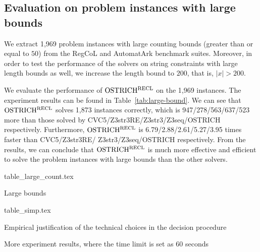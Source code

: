 
%


\subsection{Evaluation on problem instances with large bounds}\label{subsec:large_bounds_eval}

We extract 1,969 problem instances with large counting bounds (greater than or equal to $50$) from the RegCoL and AutomatArk benchmark suites.  
Moreover, in order to test the performance of the solvers on string constraints with large length bounds as well, we increase the length bound to $200$, that is, $|x| > 200$.

We evaluate the performance of $\rm OSTRICH^{RECL}$ on the 1,969 instances. 
The experiment results can be found in Table~\ref{tab:large-bound}. We can see that $\rm OSTRICH^{RECL}$ solves 1,873 instances correctly, which is 947/278/563/637/523 more than those solved by CVC5/Z3str3RE/Z3str3/Z3seq/OSTRICH respectively. Furthermore, $\rm OSTRICH^{RECL}$ is 6.79/2.88/2.61/5.27/3.95 times faster than CVC5/Z3str3RE/ Z3str3/Z3seq/OSTRICH respectively. From the results, we can conclude that $\rm OSTRICH^{RECL}$ is much more effective and efficient to solve the problem instances with large bounds than the other solvers.  

\begin{table}
  \centering
  \begin{subtable}{0.53\textwidth}
      \centering
    {table_large_count.tex}
      \caption{Large bounds}
      \label{tab:large-bound}
  \end{subtable}
  \begin{subtable}{0.45\textwidth}
      \centering
      {table_simp.tex}
      \caption{Empirical justification of the technical choices in the decision procedure}
      \label{tab:results_simp}
  \end{subtable}
  \caption{More experiment results, where the time limit is set as 60 seconds}
\end{table}


